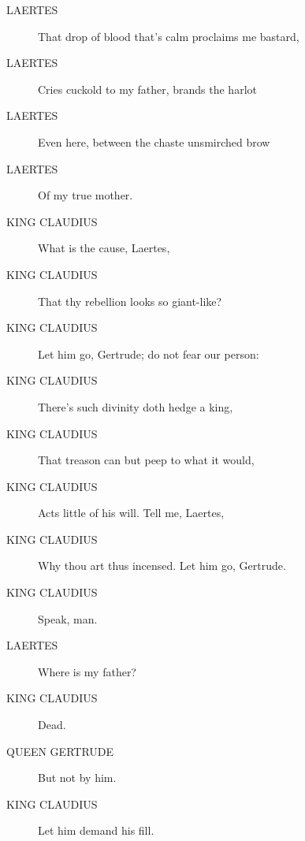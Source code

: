 \documentclass{article}
\begin{document}
\begin{description}
            
\item[LAERTES] That drop of blood that's calm proclaims me bastard,
\item[LAERTES] Cries cuckold to my father, brands the harlot
\item[LAERTES] Even here, between the chaste unsmirched brow
\item[LAERTES] Of my true mother.
\end{description}
          
\begin{description}
            
\item[KING CLAUDIUS] What is the cause, Laertes,
\item[KING CLAUDIUS] That thy rebellion looks so giant-like?
\item[KING CLAUDIUS] Let him go, Gertrude; do not fear our person:
\item[KING CLAUDIUS] There's such divinity doth hedge a king,
\item[KING CLAUDIUS] That treason can but peep to what it would,
\item[KING CLAUDIUS] Acts little of his will. Tell me, Laertes,
\item[KING CLAUDIUS] Why thou art thus incensed. Let him go, Gertrude.
\item[KING CLAUDIUS] Speak, man.
\end{description}
          
\begin{description}
            
\item[LAERTES] Where is my father?
\end{description}
          
\begin{description}
            
\item[KING CLAUDIUS] Dead.
\end{description}
          
\begin{description}
            
\item[QUEEN GERTRUDE] But not by him.
\end{description}
          
\begin{description}
            
\item[KING CLAUDIUS] Let him demand his fill.
\end{description}
          
\end{document}

